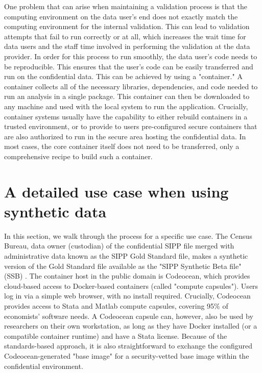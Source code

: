 \documentclass[]{hdsr}
\begin{document}
One problem that can arise when maintaining a validation process is that the 
computing environment on the data user’s end does not exactly match the computing environment for
the internal validation. This can lead to validation attempts that fail to run correctly or at all, which
increases the wait time for data users and the staff time involved in performing the validation at the data provider. 
In order for this process to run smoothly, the data user's code needs to be reproducible.  This ensures that the user’s code can be easily transferred and
run on the confidential data. This can be achieved by using a "container." A container collects all of the
necessary libraries, dependencies, and code needed to run an analysis in a single
package. This container can then be downloaded to any machine and used with the local system to run
the application. Crucially, container systems usually have the capability to either rebuild containers in a trusted environment, or to provide to users pre-configured secure containers that are also authorized to run in the secure area hosting the confidential data. In most cases, the core container itself does not need to be transferred, only a comprehensive recipe to build such a container.

\section{A detailed use case when using synthetic data}
\label{sec:usecase}

In this section, we walk through the process for a specific use case. The Census Bureau, data owner (custodian) of the confidential SIPP file merged with administrative data known as the SIPP Gold Standard file, makes a synthetic version of the Gold Standard file available as the "SIPP Synthetic Beta file" (SSB) \citep{Benedettoetal_2013}. The container host in the public domain is Codeocean, which provides cloud-based access to Docker-based containers (called "compute capsules"). Users log in via a simple web browser, with no install required. Crucially, Codeocean provides access to Stata and Matlab compute capsules, covering 95\% of economists' software needs. A Codeocean capsule can, however, also be used by researchers on their own workstation, as long as they have Docker installed (or a compatible container runtime) and have a Stata license. Because of the standards-based approach, it is also straightforward to exchange the configured Codeocean-generated "base image" for a security-vetted base image within the confidential environment.
\end{document}
